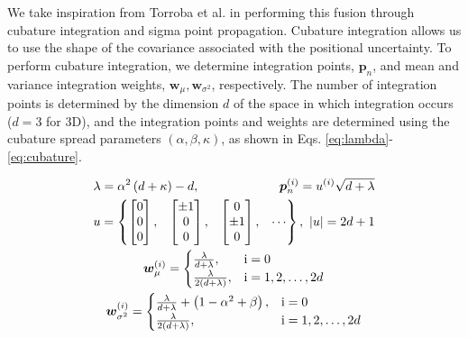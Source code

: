 We take inspiration from Torroba et al. \cite{torroba_fully-probabilistic_2022} in performing this fusion through cubature integration and sigma point propagation.
Cubature integration allows us to use the shape of the covariance associated with the positional uncertainty.
To perform cubature integration, we determine integration points, $\mathbf{p}_n$, and mean and variance integration weights, $\boldsymbol{w}_\mu, \boldsymbol{w}_{\sigma^2}$, respectively.
The number of integration points is determined by the dimension $d$ of the space in which integration occurs ($d=3$ for 3D), and the integration points and weights are determined using the cubature spread parameters $\left(\alpha, \beta, \kappa\right)$, as shown in Eqs. \eqref{eq:lambda}-\eqref{eq:cubature}.



\begin{gather}
 \lambda = \alpha^2\left(d + \kappa\right)-d, \ \ \hfill \boldsymbol{p}_n^{(i)} = u^{(i)}\sqrt{d+\lambda} \label{eq:lambda}\\
    u = \begin{Bmatrix}
       \begin{bmatrix}
           0 \\ 0 \\  0
       \end{bmatrix}, & \begin{bmatrix}
           \pm1 \\ 0 \\  0
       \end{bmatrix}, & \begin{bmatrix}
           0 \\ \pm1 \\  0
       \end{bmatrix},
       & \cdots
    \end{Bmatrix},\ \vert u \rvert = 2d+1 \\
    \boldsymbol{w}^{(i)}_\mu = \begin{cases}
        \frac{\lambda}{d + \lambda},& \text{i}=0 \\
        \frac{\lambda}{2(d + \lambda)}, & \text{i}=1,2,\dots,2d
    \end{cases} \\
    \boldsymbol{w}^{(i)}_{\sigma^2} = \begin{cases}
        \frac{\lambda}{d + \lambda} + \left(1 - \alpha^2 + \beta\right),& \text{i}=0 \\
        \frac{\lambda}{2(d + \lambda)}, & \text{i}=1,2,\dots,2d
    \end{cases}
    \label{eq:cubature}    
\end{gather}

